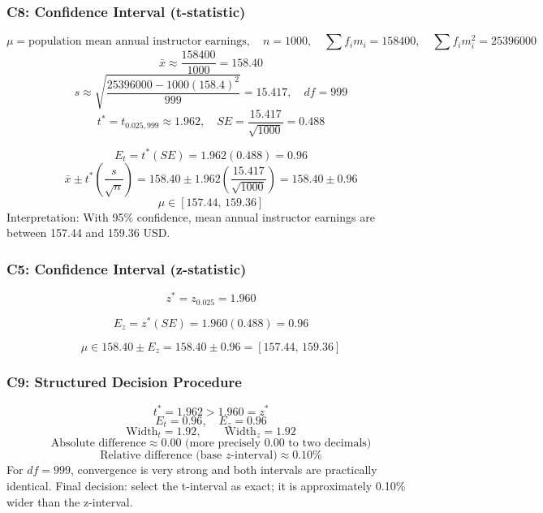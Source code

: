 \begin{ExamProblems}
		\subsubsection*{C8: Confidence Interval (t-statistic)}
		\[
		\mu=\text{population mean annual instructor earnings},\quad n=1000,\quad \sum f_im_i=158400,\quad \sum f_im_i^2=25396000
		\]
		\[
		\bar{x}\approx\frac{158400}{1000}=158.40
		\]
		\[
		s\approx\sqrt{\frac{25396000-1000(158.4)^2}{999}}=15.417,\quad df=999
		\]
		\[
		t^*=t_{0.025,999}\approx 1.962,\quad SE=\frac{15.417}{\sqrt{1000}}=0.488
		\]

		\[
		E_t=t^*(SE)=1.962(0.488)=0.96
		\]
		\[
		\bar{x}\pm t^*\left(\frac{s}{\sqrt{n}}\right)=158.40\pm 1.962\left(\frac{15.417}{\sqrt{1000}}\right)=158.40\pm 0.96
		\]
		\[
		\mu\in[157.44,\,159.36]
		\]
		Interpretation: With 95\% confidence, mean annual instructor earnings are between 157.44 and 159.36 USD.

		\subsubsection*{C5: Confidence Interval (z-statistic)}
		\[
		z^*=z_{0.025}=1.960
		\]

		\[
		E_z=z^*(SE)=1.960(0.488)=0.96
		\]

		\[
		\mu\in 158.40\pm E_z=158.40\pm 0.96=[157.44,\,159.36]
		\]

		\subsubsection*{C9: Structured Decision Procedure}
		\[
		t^*=1.962>1.960=z^*
		\]
		\[
		E_t=0.96,\quad E_z=0.96
		\]
		\[
		\text{Width}_t=1.92,\qquad \text{Width}_z=1.92
		\]
		\[
		\text{Absolute difference}\approx 0.00\text{ (more precisely }0.00\text{ to two decimals)}
		\]
		\[
		\text{Relative difference (base }z\text{-interval)}\approx 0.10\%
		\]
		For $df=999$, convergence is very strong and both intervals are practically identical.
		Final decision: select the t-interval as exact; it is approximately 0.10\% wider than the z-interval.


\end{ExamProblems}
